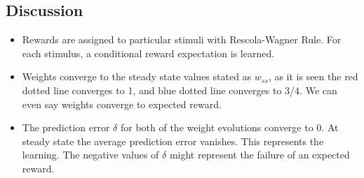 \documentclass{article}
\begin{document}
\subsection{Discussion}
\begin{itemize}
\item Rewards are assigned to particular stimuli with Rescola-Wagner Rule. For each stimulus, a conditional reward expectation is learned. 
 \item Weights converge to the steady state values stated as $w_{ss}$, as it is seen the red dotted line converges to 1, and blue dotted line converges to 3/4. We can even say weights converge to expected reward.
\item The prediction error $\delta$ for both of the weight evolutions converge to 0. At steady state the average prediction error vanishes. This represents the learning. The negative values of $\delta$ might represent the failure of an expected reward.
\end{itemize}
\end{document}
